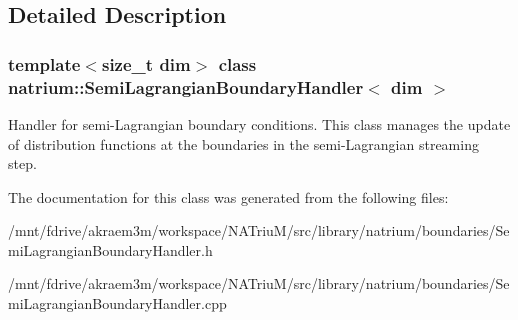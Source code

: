 \subsection{Detailed Description}
\subsubsection*{template$<$size\_\-t dim$>$ class natrium::SemiLagrangianBoundaryHandler$<$ dim $>$}

Handler for semi-\/Lagrangian boundary conditions. This class manages the update of distribution functions at the boundaries in the semi-\/Lagrangian streaming step. 

The documentation for this class was generated from the following files:\begin{DoxyCompactItemize}
\item 
/mnt/fdrive/akraem3m/workspace/NATriuM/src/library/natrium/boundaries/SemiLagrangianBoundaryHandler.h\item 
/mnt/fdrive/akraem3m/workspace/NATriuM/src/library/natrium/boundaries/SemiLagrangianBoundaryHandler.cpp\end{DoxyCompactItemize}
